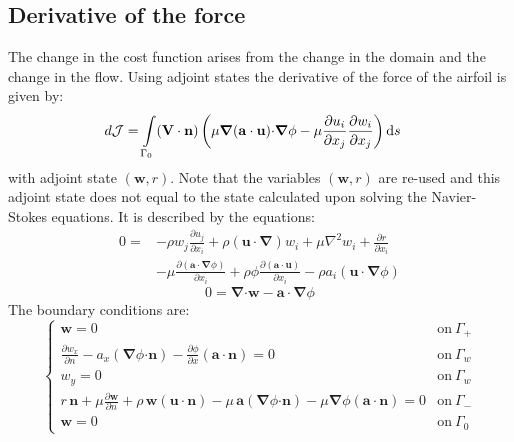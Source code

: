 \documentclass[12pt, a4paper]{article}
\begin{document}
    \subsection{Derivative of the force}
    The change in the cost function arises from the change in the domain and the change in the flow. Using adjoint states the derivative of the force of the airfoil is given by:
    \begin{equation} \label{cost_derivative_definition}
    \begin{split}
    d \mathcal{J} = \int\limits_{\Gamma_0}(\mathbf{V \cdot n}) \, \bigg{(} &
    \mu \boldsymbol{\nabla}(\mathbf{a \cdot u}) \mathbf{\cdot} \boldsymbol{\nabla} \phi -
    \mu \frac{\partial u_i}{\partial x_j} \frac{\partial w_i}{\partial x_j}
    \bigg{)} \, \mathrm{d}s
    \end{split}
    \end{equation}
    with adjoint state $(\mathbf{w},r)$. Note that the variables $(\mathbf{w},r)$ are re-used and this adjoint state does not equal to the state calculated upon solving the Navier-Stokes equations. It is described by the equations:
    \begin{equation} \label{adj_velocity_definition}
    \begin{split}
    0 = & -\rho w_j \frac{\partial u_j}{\partial x_i} +
    \rho (\mathbf{u \cdot} \boldsymbol{\nabla}) w_i +
    \mu \nabla^2 w_i +
    \frac{\partial r}{\partial x_i} \\ 
    & -\mu \frac{\partial (\mathbf{a \cdot} \boldsymbol{\nabla} \phi)}{\partial x_i} +
    \rho \phi \frac{\partial (\mathbf{a \cdot u})}{\partial x_i} - 
    \rho a_i (\mathbf{u \cdot} \boldsymbol{\nabla} \phi)
    \end{split}
    \end{equation}
    \begin{equation} \label{adj_pressure_definition}
    0 = \boldsymbol{\nabla} \mathbf{\cdot w} - 
    \mathbf{a \cdot} \boldsymbol{\nabla} \phi
    \end{equation}
    The boundary conditions are:
    \begin{equation}
    \begin{cases}
    \mathbf{w} = 0	 	&	\text{on}\ \Gamma_+ \\
    \frac{\partial w_x}{\partial n} - a_x (\boldsymbol{\nabla} \phi \mathbf{\cdot n}) - 
    \frac{\partial \phi}{\partial x} (\mathbf{a \cdot n}) = 0	&	\text{on}\ \Gamma_w \\
    w_y = 0				&	\text{on}\ \Gamma_w \\
    r \, \mathbf{n} + \mu \frac{\partial \mathbf{w}}{\partial n} + \rho \, \mathbf{w} (\mathbf{u \cdot n}) - 
    \mu \, \mathbf{a} (\boldsymbol{\nabla} \phi \mathbf{\cdot n}) - 
    \mu \boldsymbol{\nabla} \phi (\mathbf{a \cdot n}) = 0	   	&	\text{on}\ \Gamma_- \\
    \mathbf{w} = 0	 	&	\text{on}\ \Gamma_0
    \end{cases}
    \end{equation}
\end{document}
